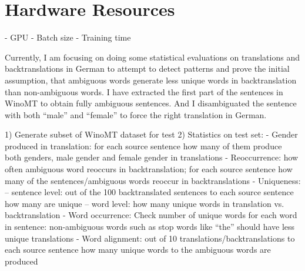 \section{Hardware Resources}
\label{sec:Experiments:Hardware}
- GPU
- Batch size
- Training time


Currently, I am focusing on doing some statistical evaluations on translations and backtranslations in German to attempt to detect patterns and prove the initial assumption, that ambiguous words generate less unique words in backtranslation than non-ambiguous words. 
I have extracted the first part of the sentences in WinoMT to obtain fully ambiguous sentences. And I disambiguated the sentence with both “male” and “female” to force the right translation in German.

1) Generate subset of WinoMT dataset for test
2) Statistics on test set:
- Gender produced in translation: for each source sentence how many of them produce both genders, male gender and female gender in translations
- Reoccurrence: how often ambiguous word reoccurs in backtranslation; for each source sentence how many of the sentences/ambiguous words reoccur in backtranslations
- Uniqueness: 
-- sentence level: out of the 100 backtranslated sentences to each source sentence how many are unique
-- word level: how many unique words in translation vs. backtranslation
- Word occurrence: Check number of unique words for each word in sentence: non-ambiguous words such as stop words like “the” should have less unique translations 
- Word alignment: out of 10 translations/backtranslations to each source sentence how many unique words to the ambiguous words are produced


